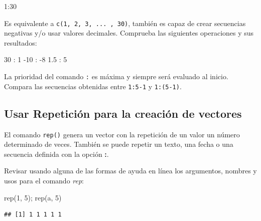 \documentclass[
]{book}
\newenvironment{Shaded}{\begin{snugshade}}{\end{snugshade}}
\newcommand{\DecValTok}[1]{\textcolor[rgb]{0.00,0.00,0.81}{#1}}
\newcommand{\FloatTok}[1]{\textcolor[rgb]{0.00,0.00,0.81}{#1}}
\newcommand{\FunctionTok}[1]{\textcolor[rgb]{0.00,0.00,0.00}{#1}}
\newcommand{\NormalTok}[1]{#1}
\newcommand{\SpecialCharTok}[1]{\textcolor[rgb]{0.00,0.00,0.00}{#1}}
\newcommand{\StringTok}[1]{\textcolor[rgb]{0.31,0.60,0.02}{#1}}
\begin{document}
\begin{Shaded}
\begin{Highlighting}[]
\DecValTok{1}\SpecialCharTok{:}\DecValTok{30}
\end{Highlighting}
\end{Shaded}

Es equivalente a \texttt{c(1,\ 2,\ 3,\ ...\ ,\ 30)}, también es capaz de crear secuencias negativas y/o usar valores decimales. Comprueba las siguientes operaciones y sus resultados:

\begin{Shaded}
\begin{Highlighting}[]
\DecValTok{30} \SpecialCharTok{:} \DecValTok{1}
\SpecialCharTok{{-}}\DecValTok{10} \SpecialCharTok{:} \SpecialCharTok{{-}}\DecValTok{8}
\FloatTok{1.5} \SpecialCharTok{:} \DecValTok{5}
\end{Highlighting}
\end{Shaded}

La prioridad del comando \texttt{:} es máxima y siempre será evaluado al inicio. Compara las secuencias obtenidas entre \texttt{1:5-1} y \texttt{1:(5-1)}.

\hypertarget{usar-rep}{%
\subsection{\texorpdfstring{Usar \textbf{Repetición} para la creación de vectores}{Usar Repetición para la creación de vectores}}\label{usar-rep}}

El comando \texttt{rep()} genera un vector con la repetición de un valor un número determinado de veces. También se puede repetir un texto, una fecha o una secuencia definida con la opción \textbf{:}.

Revisar usando alguna de las formas de ayuda en línea los argumentos, nombres y usos para el comando \emph{rep}:

\begin{Shaded}
\begin{Highlighting}[]
\FunctionTok{rep}\NormalTok{(}\DecValTok{1}\NormalTok{, }\DecValTok{5}\NormalTok{); }\FunctionTok{rep}\NormalTok{(}\StringTok{\textquotesingle{}a\textquotesingle{}}\NormalTok{, }\DecValTok{5}\NormalTok{)}
\end{Highlighting}
\end{Shaded}

\begin{verbatim}
## [1] 1 1 1 1 1
\end{verbatim}
\end{document}
